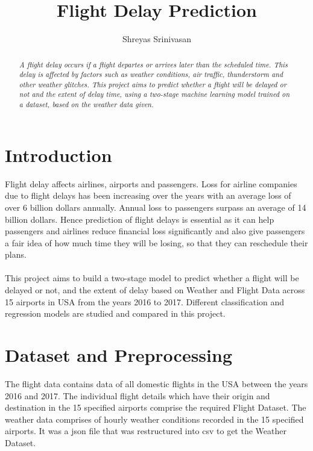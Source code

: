 \documentclass[12pt,letter-paper]{article}
\begin{document}
\title{Flight Delay Prediction}
\author{Shreyas Srinivasan}
\date{}
\maketitle

\begin{abstract}
    \textit{A flight delay occurs if a flight departes or arrives later than the scheduled time. This delay is affected by factors such as weather conditions, air traffic, thunderstorm and other weather glitches. This project aims to predict whether a flight will be delayed or not and the extent of delay time, using a two-stage machine learning model trained on a dataset, based on the weather data given.}
\end{abstract}


\section{Introduction}

    Flight delay affects airlines, airports and passengers. Loss for airline companies due to flight delays has been increasing over the years with an average loss of over 6 billion dollars annually. Annual loss to passengers surpass an average of 14 billion dollars. Hence prediction of flight delays is essential as it can help passengers and airlines reduce financial loss significantly and also give passengers a fair idea of how much time they will be losing, so that they can reschedule their plans.
    \paragraph{}
    This project aims to build a two-stage model to predict whether a flight will be delayed or not, and the extent of delay based on Weather and Flight Data across 15 airports in USA from the years 2016 to 2017. Different classification and regression models are studied and compared in this project.
    
\section{Dataset and Preprocessing}
   
     The flight data contains data of all domestic flights in the USA between the years 2016 and 2017. The individual flight details which have their origin and destination in the 15 specified airports comprise the required Flight Dataset. The weather data comprises of hourly weather conditions recorded in the 15 specified airports. It was a json file that was restructured into csv to get the Weather Dataset. 
\end{document}
